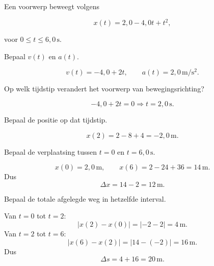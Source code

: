 \documentclass{ximera}
\begin{document}
\begin{oefening}{\oefU\ESS}

Een voorwerp beweegt volgens

\[x(t)=2,0-4,0t+t^2,\]

voor $0\leq t\leq6,0\,\mathrm{s}$.

\begin{question}

Bepaal $v(t)$ en $a(t)$.

\begin{oplossing}
\[v(t)=-4,0+2t,\qquad a(t)=2,0\,\mathrm{m/s^2}.\]
\end{oplossing}

\end{question}

\begin{question}

Op welk tijdstip verandert het voorwerp van bewegingsrichting?

\begin{oplossing}
\[-4,0+2t=0\Longrightarrow t=2,0\,\mathrm{s}.\]
\end{oplossing}

\end{question}

\begin{question}

Bepaal de positie op dat tijdstip.

\begin{oplossing}
\[x(2)=2-8+4=-2,0\,\mathrm{m}.\]
\end{oplossing}

\end{question}

\begin{question}

Bepaal de verplaatsing tussen $t=0$ en $t=6,0\,\mathrm{s}$.

\begin{oplossing}
\[x(0)=2,0\,\mathrm{m},\qquad x(6)=2-24+36=14\,\mathrm{m}.\]
Dus
\[\Delta x=14-2=12\,\mathrm{m}.\]
\end{oplossing}

\end{question}

\begin{question}

Bepaal de totale afgelegde weg in hetzelfde interval.

\begin{oplossing}
Van \(t=0\) tot \(t=2\):
\[|x(2)-x(0)|=|-2-2|=4\,\mathrm{m}.\]
Van \(t=2\) tot \(t=6\):
\[|x(6)-x(2)|=|14-(-2)|=16\,\mathrm{m}.\]
Dus
\[\Delta s=4+16=20\,\mathrm{m}.\]
\end{oplossing}


\end{question}
\end{oefening}
\end{document}

